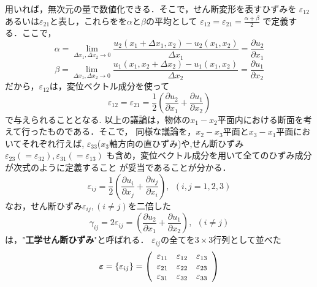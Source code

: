 \documentclass[10pt,a4j]{jarticle}
\begin{document}
用いれば，無次元の量で数値化できる．そこで，せん断変形を表すひずみを
$\varepsilon_{12}$あるいは$\varepsilon_{21}$と表し，これらをを$\alpha$と$\beta$の平均として
$\varepsilon_{12}=\varepsilon_{21}=\frac{\alpha+\beta}{2}$
で定義する．ここで，
\begin{equation}
	\alpha=
	\lim_{\Delta x_1,\Delta x_2 \rightarrow 0}
	\frac{u_2(x_1+\Delta x_1,x_2)-u_2(x_1,x_2)}{\Delta x_1}
	=\frac{\partial u_2}{\partial x_1}
	\label{eqn:alpha}
\end{equation}
\begin{equation}
	\beta=
	\lim_{\Delta x_1,\Delta x_2 \rightarrow 0}
	\frac{u_1(x_1,x_2+\Delta x_2)-u_1(x_1,x_2)}{\Delta x_2}
	=\frac{\partial u_1}{\partial x_2}
	\label{eqn:alpha}
\end{equation}
だから，$\varepsilon_{12}$は，変位ベクトル成分を使って
\begin{equation}
	\varepsilon_{12}=
	\varepsilon_{21}=
	\frac{1}{2}
	\left(
	\frac{\partial u_2}{\partial x_1}
	+
	\frac{\partial u_1}{\partial x_2}
	\right)
	\label{eqn:def_e12}
\end{equation}
で与えられることとなる.
以上の議論は，物体の$x_1-x_2$平面内における断面を考えて行ったものである．そこで，
同様な議論を，$x_2-x_3$平面と$x_3-x_1$平面においてそれぞれ行えば,
$\varepsilon_{33}$($x_3$軸方向の直ひずみ)や,せん断ひずみ
$\varepsilon_{23}(=\varepsilon_{32}), \varepsilon_{31}(=\varepsilon_{13})$
も含め，変位ベクトル成分を用いて全てのひずみ成分が次式のように定義すること
が妥当であることが分かる．
\begin{equation}
	\varepsilon_{ij}=\frac{1}{2}
	\left(
	\frac{\partial u_i}{\partial x_j}
	+
	\frac{\partial u_j}{\partial x_i}
	\right), \ \ (i,j=1,2,3)
	\label{eqn:def_eij}
\end{equation}
なお，せん断ひずみ$\varepsilon_{ij},(i\neq j)$を二倍した
\begin{equation}
	\gamma_{ij}=2\varepsilon_{ij}
	=
	\left(
	\frac{\partial u_2}{\partial x_1}
	+
	\frac{\partial u_1}{\partial x_2}
	\right), \ \ (i\neq j)
	\label{eqn:def_g12}
\end{equation}
は，"{\bf 工学せん断ひずみ}"と呼ばれる．
$\varepsilon_{ij}$の全てを$3\times 3$行列として並べた
\begin{equation}
	\mbox{\boldmath $\varepsilon$}=\left\{ \varepsilon_{ij}\right\}
	=\left(
	\begin{array}{ccc}
		\varepsilon_{11} & \varepsilon_{12} & \varepsilon_{13}\\
		\varepsilon_{21} & \varepsilon_{22} & \varepsilon_{23}\\
		\varepsilon_{31} & \varepsilon_{32} & \varepsilon_{33}
	\end{array}
	\right)
	\label{eqn:def_emat}
\end{equation}
\end{document}
